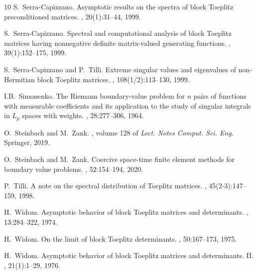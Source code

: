 \documentclass[addpoints,12pt,letter]{article}
\numberwithin{equation}{section}
\theoremstyle{definition}
\begin{document}
\begin{thebibliography}{10}
S.~Serra-Capizzano.
\newblock Asymptotic results on the spectra of block {T}oeplitz preconditioned matrices.
, 20(1):31--44, 1999.

S.~Serra-Capizzano.
\newblock Spectral and computational analysis of block {T}oeplitz matrices having nonnegative definite matrix-valued generating functions.
, 39(1):152--175, 1999.

S.~Serra-Capizzano and P.~Tilli.
\newblock Extreme singular values and eigenvalues of non-{H}ermitian block {T}oeplitz matrices.
, 108(1/2):113--130, 1999.

{\relax I.B}.~Simonenko.
\newblock The {R}iemann boundary-value problem for $n$ pairs of functions with measurable coefficients and its application to the study of singular integrals in {$L_{p}$} spaces with weights.
, 28:277--306, 1964.

O.~Steinbach and M.~Zank.
, volume 128 of {\em Lect. Notes Comput. Sci. Eng.}
\newblock Springer, 2019.

O.~Steinbach and M.~Zank.
\newblock Coercive space-time finite element methods for boundary value problems.
, 52:154--194, 2020.

P.~Tilli.
\newblock A note on the spectral distribution of {T}oeplitz matrices.
, 45(2-3):147--159, 1998.

H.~Widom.
\newblock Asymptotic behavior of block {T}oeplitz matrices and determinants.
, 13:284--322, 1974.

H.~Widom.
\newblock On the limit of block {T}oeplitz determinants.
, 50:167--173, 1975.

H.~Widom.
\newblock Asymptotic behavior of block {T}oeplitz matrices and determinants. {II}.
, 21(1):1--29, 1976.

\end{thebibliography}
\end{document}
